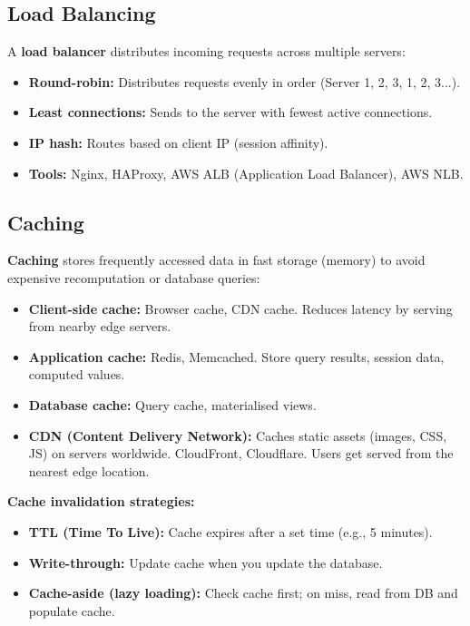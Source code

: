 \documentclass[12pt, a4paper, oneside]{book}
\begin{document}
\subsection{Load Balancing}

A \textbf{load balancer} distributes incoming requests across multiple servers:

\begin{itemize}[leftmargin=2em]
    \item \textbf{Round-robin:} Distributes requests evenly in order (Server 1, 2, 3, 1, 2, 3...).
    \item \textbf{Least connections:} Sends to the server with fewest active connections.
    \item \textbf{IP hash:} Routes based on client IP (session affinity).
    \item \textbf{Tools:} Nginx, HAProxy, AWS ALB (Application Load Balancer), AWS NLB.
\end{itemize}

\subsection{Caching}

\textbf{Caching} stores frequently accessed data in fast storage (memory) to avoid expensive recomputation or database queries:

\begin{itemize}[leftmargin=2em]
    \item \textbf{Client-side cache:} Browser cache, CDN cache. Reduces latency by serving from nearby edge servers.
    \item \textbf{Application cache:} Redis, Memcached. Store query results, session data, computed values.
    \item \textbf{Database cache:} Query cache, materialised views.
    \item \textbf{CDN (Content Delivery Network):} Caches static assets (images, CSS, JS) on servers worldwide. CloudFront, Cloudflare. Users get served from the nearest edge location.
\end{itemize}

\textbf{Cache invalidation strategies:}
\begin{itemize}[leftmargin=2em]
    \item \textbf{TTL (Time To Live):} Cache expires after a set time (e.g., 5 minutes).
    \item \textbf{Write-through:} Update cache when you update the database.
    \item \textbf{Cache-aside (lazy loading):} Check cache first; on miss, read from DB and populate cache.
\end{itemize}
\end{document}
